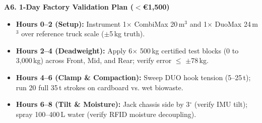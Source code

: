 \documentclass[10pt,a4paper]{article}
\begin{document}
\vspace{-3pt}

\begin{minipage}[t]{0.485\textwidth}
  \begin{tcolorbox}[colback=white, colframe=bordergray, arc=3pt, boxsep=2pt, left=4pt, right=4pt, top=3pt, bottom=3pt]
  {\fontsize{7.2pt}{8.2pt}\selectfont \textbf{\color{techgreen}A6. 1-Day Factory Validation Plan ($<$\euro{}1,500)}}\\[2pt]
  {\fontsize{6.3pt}{7.4pt}\selectfont
  \begin{itemize}
    \item \textbf{Hours 0--2 (Setup):} Instrument 1$\times$ CombiMax 20\,m$^3$ and 1$\times$ DuoMax 24\,m$^3$ over reference truck scale ($\pm$5\,kg truth).
    \item \textbf{Hours 2--4 (Deadweight):} Apply 6$\times$ 500\,kg certified test blocks (0 to 3,000\,kg) across Front, Mid, and Rear; verify error $\le$ $\pm$78\,kg.
    \item \textbf{Hours 4--6 (Clamp \& Compaction):} Sweep DUO hook tension (5--25\,t); run 20 full 35\,t strokes on cardboard vs. wet biowaste.
    \item \textbf{Hours 6--8 (Tilt \& Moisture):} Jack chassis side by 3$^\circ$ (verify IMU tilt); spray 100--400\,L water (verify RFID moisture decoupling).
  \end{itemize}
  }
  \end{tcolorbox}
\end{minipage}%
\hfill
\end{document}
